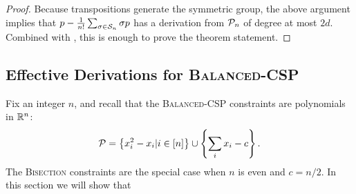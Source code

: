 \begin{proof}
Because transpositions generate the symmetric group, the above argument implies that $p - \frac{1}{n!}\sum_{\sigma \in \mathcal S_n} \sigma p$ has a derivation from $\mathcal P_n$ of degree at most $2d$. Combined with , this is enough to prove the theorem statement. 
\end{proof}

\subsection{Effective Derivations for \textsc{Balanced-CSP}}
Fix an integer $n$, and recall that the \textsc{Balanced-CSP} constraints are polynomials in $\mathbb R^n$:
\[\mathcal P = \left\{x_i^2 - x_i| i \in [n]\right\} \cup \left\{\sum_i x_i - c\right\}.\]
The \textsc{Bisection} constraints are the special case when $n$ is even and $c = n/2$. In this section we will show that 